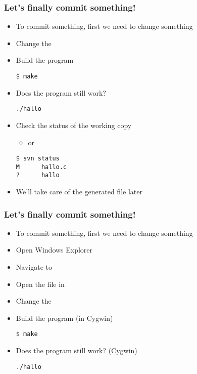 \begin{frame}[fragile]
    \linuxframe
    \frametitle{Let's finally commit something!}
    \begin{itemize}
        \item To commit something, first we need to change something
        \item Change the 
        \item Build the program
\begin{lstlisting}
$ make
\end{lstlisting}
        \item Does the program still work?
\begin{lstlisting}
./hallo
\end{lstlisting}
        \item Check the status of the working copy
        \begin{itemize}
            \item {} or 
        \end{itemize}
\begin{lstlisting}
$ svn status
M      hallo.c
?      hallo
\end{lstlisting}
        \item We'll take care of the generated  file later
    \end{itemize}
\end{frame}

\begin{frame}[fragile]
    \frametitle{Let's finally commit something!}
    \begin{itemize}
        \item To commit something, first we need to change something
        \item Open Windows Explorer
        \item Navigate to
        \item Open the file  in \notepad
        \item Change the 
        \item Build the program (in Cygwin)
\begin{lstlisting}
$ make
\end{lstlisting}
        \item Does the program still work? (Cygwin)
\begin{lstlisting}
./hallo
\end{lstlisting}
    \end{itemize}
\end{frame}

